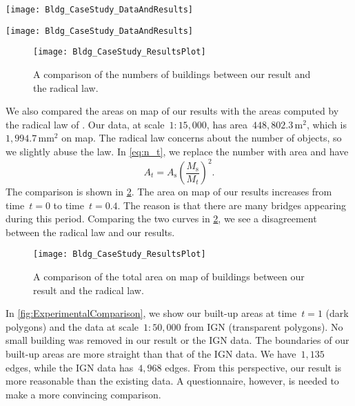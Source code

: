 \begin{figure*}[tb]
	\centering
	\texttt{[image: Bldg\_CaseStudy\_DataAndResults]}
	\caption{A sequence of maps 
		at time~$t \in \{0, 0.1, 0.2, \dots, 1\}$ 
		of marked region~$R_1$
		in \fig\ref{fig:Bldg_GoalShape}.
	}
	\label{fig:ContinuousGeneralization}
\end{figure*}

\begin{figure*}[tb]
	\centering
	\texttt{[image: Bldg\_CaseStudy\_DataAndResults]}
	\caption{Some intermediate-scale results of  
		 marked region~$R_2$ in \fig\ref{fig:Bldg_GoalShape}.
		 When time~$t=0.3$, there are some lengthy aggregates.
	}
	\label{fig:Bldg_Lengthy}
\end{figure*}

\begin{figure}[tb]
	\centering
	\texttt{[image: Bldg\_CaseStudy\_ResultsPlot]}
	\caption{A comparison of the numbers of buildings 
		between our result and the radical law.}
	\label{fig:NumberOfBuildings}
\end{figure}

We also compared the areas on map of our results 
with the areas computed by the radical law of \citet{Topfer1966}.
Our data, at scale~$1:15{,}000$, 
has area~$448{,}802.3\,\mathrm{m}^2$,
which is~$1{,}994.7\,\mathrm{mm}^2$ on map.
The radical law concerns about the number of 
objects, so we slightly abuse the law.
In \eq\ref{eq:n_t}, we replace the number with area and have
$$
A_t=A_\mathrm{s}\left( \frac{M_\mathrm{s}}{M_t}\right) ^2.
$$
The comparison is shown in \fig\ref{fig:AreaOfBuildings}.
The area on map of our results increases 
from time~$t=0$ to time~$t=0.4$. 
The reason is that 
there are many bridges appearing during this period.
Comparing the two curves in \fig\ref{fig:AreaOfBuildings},
we see a disagreement between
the radical law and our results.

\begin{figure}[tb]
	\centering
	\texttt{[image: Bldg\_CaseStudy\_ResultsPlot]}
	\caption{A comparison of the total area on map of buildings 
		between our result and the radical law.}
	\label{fig:AreaOfBuildings}
\end{figure}

In \fig\ref{fig:ExperimentalComparison},
we show our built-up areas at time~$t=1$ (dark polygons)
and the data at scale~$1:50{,}000$ 
from IGN (transparent polygons).
No small building was removed in
our result or the IGN data.
The boundaries of our built-up areas 
are more straight than that of the IGN data. 
We have~$1{,}135$ edges, 
while the IGN data has~$4{,}968$ edges.
From this perspective, our result is 
more reasonable than the existing data.
A questionnaire, however, is needed to 
make a more convincing comparison.

